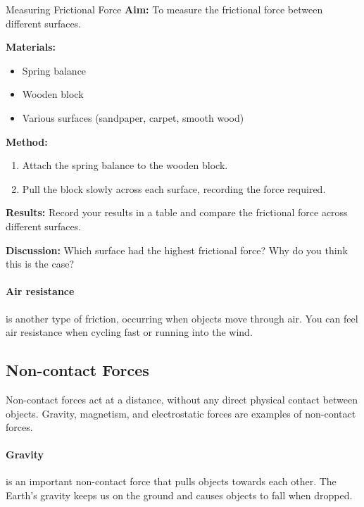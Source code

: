 \begin{investigation}{Measuring Frictional Force}
\textbf{Aim:} To measure the frictional force between different surfaces.

\textbf{Materials:}
\begin{itemize}
    \item Spring balance
    \item Wooden block
    \item Various surfaces (sandpaper, carpet, smooth wood)
\end{itemize}

\textbf{Method:}
\begin{enumerate}
    \item Attach the spring balance to the wooden block.
    \item Pull the block slowly across each surface, recording the force required.
\end{enumerate}

\textbf{Results:} Record your results in a table and compare the frictional force across different surfaces.

\textbf{Discussion:} Which surface had the highest frictional force? Why do you think this is the case?
\end{investigation}


\paragraph{Air resistance} is another type of friction, occurring when objects move through air. You can feel air resistance when cycling fast or running into the wind.

\subsection{Non-contact Forces}

Non-contact forces act at a distance, without any direct physical contact between objects. Gravity, magnetism, and electrostatic forces are examples of non-contact forces.

\paragraph{Gravity} is an important non-contact force that pulls objects towards each other. The Earth's gravity keeps us on the ground and causes objects to fall when dropped.

